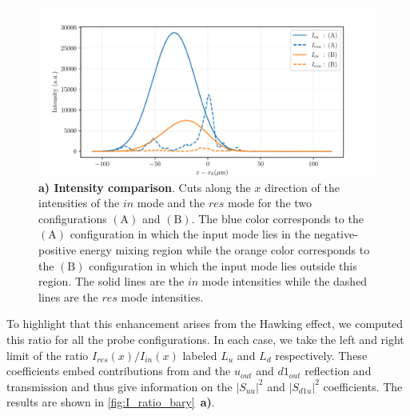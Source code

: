 \begin{figure}
    \centering
    \includegraphics[width=1\textwidth]{chap_stimulated_hawking/fig/intensity_comparison.pdf}
    \caption{\textbf{a) Intensity comparison}. Cuts along the $x$ direction of the intensities of the $in$ mode and the $res$ mode for the two configurations $\mathrm{(A)}$ and $\mathrm{(B)}$.
    The blue color corresponds to the $\mathrm{(A)}$ configuration in which the input mode lies in the negative-positive energy mixing region while the orange color corresponds to the $\mathrm{(B)}$ configuration in which the input mode lies outside this region.
    The solid lines are the $in$ mode intensities while the dashed lines are the $res$ mode intensities.}
    \label{fig:intensity_comparison}
\end{figure}

To highlight that this enhancement arises from the Hawking effect, we computed this ratio for all the probe configurations. In each case, we take the left and right limit of the ratio $I_{res}(x)/I_{in}(x)$  labeled $L_u$ and $L_d$ respectively.
These coefficients embed contributions from and the $u_{out}$ and $d1_{out}$ reflection and transmission and thus give information on the $|S_{uu}|^2$ and $|S_{d1u}|^2$ coefficients.
The results are shown in \autoref{fig:I_ratio_bary}~\textbf{a)}. 

